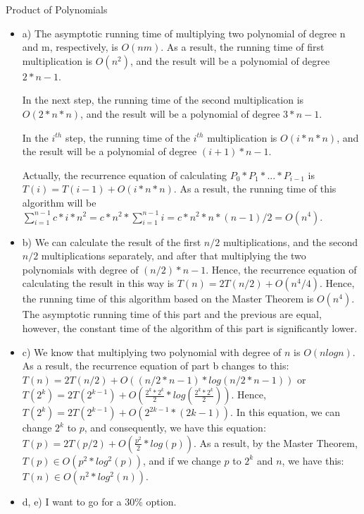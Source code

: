 \documentclass[12pt]{article}
\newenvironment{solution}[2][Solution]{\begin{trivlist}
\item[\hskip \labelsep {\bfseries #1}]}{\end{trivlist}}
\newenvironment{problem}[2][Problem]{\begin{trivlist}
\item[\hskip \labelsep {\bfseries #1}\hskip \labelsep {\bfseries #2.}]}{\end{trivlist}}
\begin{document}
\begin{problem}{4}
Product of Polynomials
\end{problem}

\begin{solution}{}
\begin{itemize}
\item a) The asymptotic running time of multiplying two polynomial of degree
n and m, respectively, is $O(nm)$. As a result, the running time of first
multiplication is $O(n^2)$, and the result will be a polynomial of degree
$2*n-1$.

In the next step, the running time of the second multiplication is 
$O(2*n*n)$, and the result will be a polynomial of degree $3*n-1$.

In the $i^{th}$ step, the running time of the $i^{th}$ multiplication is
$O(i*n*n)$, and the result will be a polynomial of degree $(i+1)*n-1$.

Actually, the recurrence equation of calculating $P_0*P_1 * ... * P_{i-1}$
is $T(i) = T(i-1) + O(i*n*n)$. As a result, the running time of this 
algorithm will be $\sum_{i=1}^{n-1} c*i*n^2 = c*n^2*\sum_{i=1}^{n-1} i = 
c * n^2 * n * (n-1) / 2 = O(n^4)$.

\item b) We can calculate the result of the first $n/2$ multiplications,
and the second $n/2$ multiplications separately, and after that multiplying
the two polynomials with degree of $(n/2)*n-1$. Hence, the recurrence 
equation of calculating the result in this way is $T(n) = 2T(n/2) + O(n^4/4)$. Hence, the running time of this algorithm based on the Master
Theorem is $O(n^4)$. The asymptotic running time of this part and the 
previous are equal, however, the constant time of the algorithm of this 
part is significantly lower.

\item c) We know that multiplying two polynomial with degree of $n$ is
$O(nlogn)$. As a result, the recurrence equation of part b changes to this:
$T(n) = 2T(n/2) + O((n/2*n-1) * log(n/2*n-1))$ or $T(2^k) = 2T(2^{k-1}) +
O(\frac{2^k*2^k}{2} * log(\frac{2^k*2^k}{2}))$. Hence, $T(2^k) = 2T(2^{k-1})
+ O(2^{2k-1} * (2k-1))$. In this equation, we can change $2^k$ to $p$, and
consequently, we have this equation: $T(p) = 2T(p/2) +
O(\frac{p^2}{2}*log(p))$. As a result, by the Master Theorem, $T(p) \in 
O(p^2*log^2(p))$, and if we change $p$ to $2^k$ and $n$, we have
this: $T(n) \in O(n^2 * log^2(n))$.
\item d, e) I want to go for a 30\% option.
\end{itemize}
\end{solution}


\pagebreak
\end{document}
